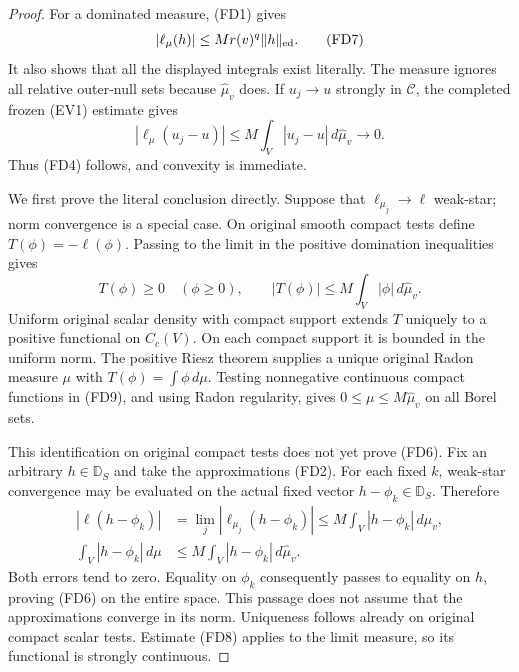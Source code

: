 \documentclass[11pt,a4paper]{article}
\numberwithin{equation}{section}
\theoremstyle{definition}
\theoremstyle{remark}
\begin{document}
\begin{proof}
For a dominated measure, \textup{(FD1)} gives
\[
       |\ell_\mu(h)|\leq M r(v)^q\|h\|_{\rm ed}.
 \tag{FD7}
\]
It also shows that all the displayed integrals exist literally.
The measure ignores all relative outer-null sets because
$\widehat\mu_v$ does. If $u_j\to u$ strongly in $\mathscr C$,
the completed frozen \textup{(EV1)} estimate gives
\[
 |\ell_\mu(u_j-u)|
 \leq M\int_V|u_j-u|\,d\widehat\mu_v\longrightarrow0.
 \tag{FD8}
\]
Thus \textup{(FD4)} follows, and convexity is immediate.

We first prove the literal conclusion directly. Suppose that
$\ell_{\mu_j}\to\ell$ weak-star; norm convergence is a special
case. On original smooth compact tests define
$T(\phi)=-\ell(\phi)$. Passing to the limit in the positive
domination inequalities gives
\[
 T(\phi)\geq0\quad(\phi\geq0),\qquad
            |T(\phi)|\leq M\int_V|\phi|\,d\widehat\mu_v.
 \tag{FD9}
\]
Uniform original scalar density with compact support extends $T$
uniquely to a positive functional on $C_c(V)$. On each compact
support it is bounded in the uniform norm. The positive Riesz
theorem supplies a unique original Radon measure $\mu$ with
$T(\phi)=\int\phi\,d\mu$. Testing nonnegative continuous compact
functions in \textup{(FD9)}, and using Radon regularity, gives
$0\leq\mu\leq M\widehat\mu_v$ on all Borel sets.

This identification on original compact tests does not yet prove
\textup{(FD6)}. Fix an arbitrary $h\in\mathbb D_S$ and take
the approximations \textup{(FD2)}. For each fixed $k$, weak-star
convergence may be evaluated on the actual fixed vector
$h-\phi_k\in\mathbb D_S$. Therefore
\[
 \begin{split}
 |\ell(h-\phi_k)|
   &=\lim_j|\ell_{\mu_j}(h-\phi_k)|
       \leq M\int_V|h-\phi_k|\,d\widehat\mu_v,\\
 \int_V|h-\phi_k|\,d\mu
   &\leq M\int_V|h-\phi_k|\,d\widehat\mu_v.
 \end{split}
 \tag{FD10}
\]
Both errors tend to zero. Equality on $\phi_k$ consequently
passes to equality on $h$, proving \textup{(FD6)} on the entire
space. This passage does not assume that the approximations
converge in its norm. Uniqueness follows already on original
compact scalar tests. Estimate \textup{(FD8)} applies to the
limit measure, so its functional is strongly continuous.


\end{proof}
\end{document}

